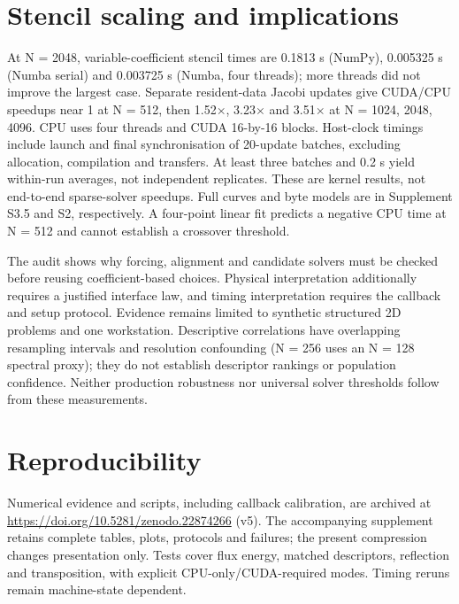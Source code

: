 \documentclass[10pt]{article}
\begin{document}
\section{Stencil scaling and implications}
At N = 2048, variable-coefficient stencil times are 0.1813 s (NumPy), 0.005325 s (Numba serial) and 0.003725 s (Numba, four threads); more threads did not improve the largest case. Separate resident-data Jacobi updates give CUDA/CPU speedups near 1 at N = 512, then 1.52\ensuremath{\times}, 3.23\ensuremath{\times} and 3.51\ensuremath{\times} at N = 1024, 2048, 4096. CPU uses four threads and CUDA 16-by-16 blocks. Host-clock timings include launch and final synchronisation of 20-update batches, excluding allocation, compilation and transfers. At least three batches and 0.2 s yield within-run averages, not independent replicates. These are kernel results, not end-to-end sparse-solver speedups. Full curves and byte models are in Supplement S3.5 and S2, respectively. A four-point linear fit predicts a negative CPU time at N = 512 and cannot establish a crossover threshold.\par
The audit shows why forcing, alignment and candidate solvers must be checked before reusing coefficient-based choices. Physical interpretation additionally requires a justified interface law, and timing interpretation requires the callback and setup protocol. Evidence remains limited to synthetic structured 2D problems and one workstation. Descriptive correlations have overlapping resampling intervals and resolution confounding (N = 256 uses an N = 128 spectral proxy); they do not establish descriptor rankings or population confidence. Neither production robustness nor universal solver thresholds follow from these measurements.\par
\section{Reproducibility}
Numerical evidence and scripts, including callback calibration, are archived at \url{https://doi.org/10.5281/zenodo.22874266} (v5). The accompanying supplement retains complete tables, plots, protocols and failures; the present compression changes presentation only. Tests cover flux energy, matched descriptors, reflection and transposition, with explicit CPU-only/CUDA-required modes. Timing reruns remain machine-state dependent.\par
\end{document}
